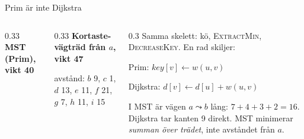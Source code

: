 \begin{frame}{Prim är inte Dijkstra}
\begin{columns}[T]
\begin{column}{0.33\textwidth}
\centering
{\small\bfseries\color{kthblue}MST (Prim), vikt 40}\par

\end{column}
\begin{column}{0.33\textwidth}
\centering
{\small\bfseries\color{plum}Kortaste-vägträd från $a$, vikt 47}\par
\par
{\scriptsize\color{plum}avstånd: $b$ 9, $c$ 1, $d$ 13, $e$ 11, $f$ 21, $g$ 7, $h$ 11, $i$ 15}
\end{column}
\begin{column}{0.3\textwidth}
\footnotesize
Samma skelett: kö, \textsc{ExtractMin}, \textsc{DecreaseKey}. En rad skiljer:\par\smallskip
Prim: $\mathit{key}[v]\gets w(u,v)$\par
Dijkstra: $d[v]\gets d[u]+w(u,v)$\par\smallskip
I MST är vägen $a\leadsto b$ lång: $7+4+3+2=16$. Dijkstra tar kanten 9 direkt.
MST minimerar \emph{summan över trädet}, inte avståndet från $a$.
\end{column}
\end{columns}
\end{frame}

